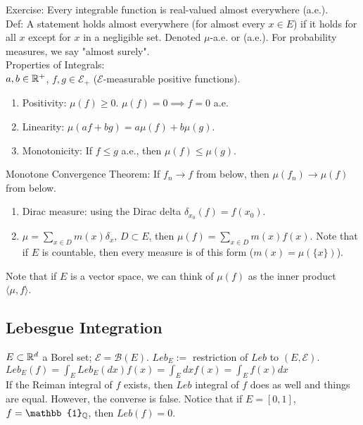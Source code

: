 \documentclass[english, 11pt]{article}
\begin{document}
Exercise: Every integrable function is real-valued almost everywhere (a.e.).\\

Def: A statement holds almost everywhere (for almost every $x \in E$) if it holds for all $x$ except for $x$ in a negligible set. Denoted $\mu$-a.e. or (a.e.). For probability measures, we say "almost surely".\\

Properties of Integrals:\\
$a, b \in {\mathbb{R}}^+$, $f, g \in \mathcal{E}_+$ ($\mathcal{E}$-measurable positive functions).

\begin{enumerate}
	\item Positivity: $\mu(f) \geq 0$. $\mu(f) = 0 \implies f = 0$ a.e.
	\item Linearity: $\mu(af + bg) = a\mu(f) + b\mu(g)$.
	\item Monotonicity: If $f \leq g$ a.e., then $\mu(f) \leq \mu(g)$.
\end{enumerate}

Monotone Convergence Theorem: If $f_n \to f$ from below, then $\mu(f_n) \to \mu(f)$ from below.\\

\begin{enumerate}
	\item Dirac measure: using the Dirac delta $\delta_{x_0} (f) = f(x_0)$.\\
	\item $\mu = \sum_{x \in D} m(x)\delta_x$, $D \subset E$, then $\mu(f) = \sum_{x \in D} m(x) f(x)$. Note that if $E$ is countable, then every measure is of this form ($m(x) = \mu(\{x\})$).
\end{enumerate}

Note that if $E$ is a vector space, we can think of $\mu(f)$ as the inner product $\langle \mu, f \rangle$.\\

\subsection{Lebesgue Integration}
$E \subset {\mathbb{R}}^d$ a Borel set; $\mathcal{E} = \mathcal{B}(E)$. $Leb_{E} :=$ restriction of $Leb$ to $(E, \mathcal{E})$.\\

$Leb_E(f) = \int_E Leb_E(dx)f(x) = \int_E dxf(x) = \int_E f(x)dx$\\

If the Reiman integral of $f$ exists, then $Leb$ integral of $f$ does as well and things are equal. However, the converse is false. Notice that if $E = [0, 1]$, $f = \mathbb{1}_\Q$, then $Leb(f) = 0$.\\
\end{document}
